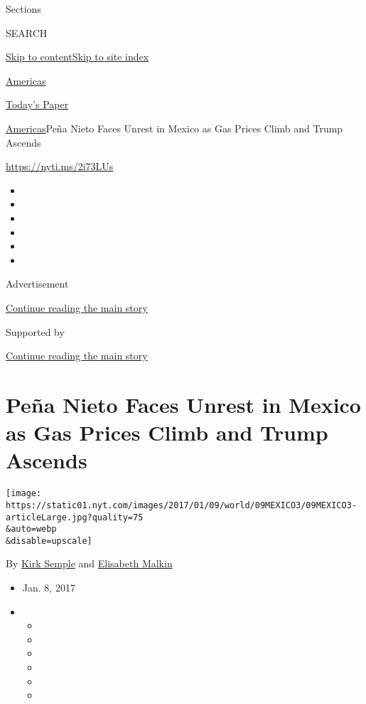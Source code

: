 Sections

SEARCH

\protect\hyperlink{site-content}{Skip to
content}\protect\hyperlink{site-index}{Skip to site index}

\href{https://www.nytimes.com/section/world/americas}{Americas}

\href{https://myaccount.nytimes.com/auth/login?response_type=cookie\&client_id=vi}{}

\href{https://www.nytimes.com/section/todayspaper}{Today's Paper}

\href{/section/world/americas}{Americas}\textbar{}Peña Nieto Faces
Unrest in Mexico as Gas Prices Climb and Trump Ascends

\url{https://nyti.ms/2i73LUs}

\begin{itemize}
\item
\item
\item
\item
\item
\item
\end{itemize}

Advertisement

\protect\hyperlink{after-top}{Continue reading the main story}

Supported by

\protect\hyperlink{after-sponsor}{Continue reading the main story}

\hypertarget{peuxf1a-nieto-faces-unrest-in-mexico-as-gas-prices-climb-and-trump-ascends}{%
\section{Peña Nieto Faces Unrest in Mexico as Gas Prices Climb and Trump
Ascends}\label{peuxf1a-nieto-faces-unrest-in-mexico-as-gas-prices-climb-and-trump-ascends}}

\texttt{[image: https://static01.nyt.com/images/2017/01/09/world/09MEXICO3/09MEXICO3-articleLarge.jpg?quality=75\\\&auto=webp\\\&disable=upscale]}

By \href{http://www.nytimes.com/by/kirk-semple}{Kirk Semple} and
\href{https://www.nytimes.com/by/elisabeth-malkin}{Elisabeth Malkin}

\begin{itemize}
\item
  Jan. 8, 2017
\item
  \begin{itemize}
  \item
  \item
  \item
  \item
  \item
  \item
  \end{itemize}
\end{itemize}

